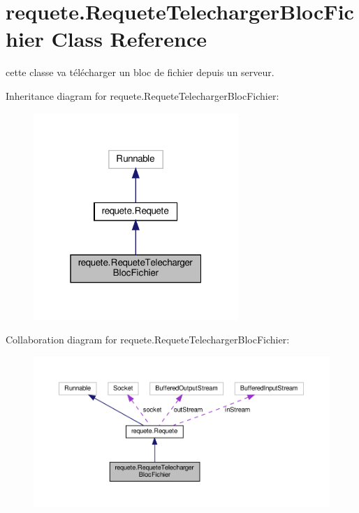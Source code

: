 \hypertarget{classrequete_1_1RequeteTelechargerBlocFichier}{}\section{requete.\+Requete\+Telecharger\+Bloc\+Fichier Class Reference}
\label{classrequete_1_1RequeteTelechargerBlocFichier}


cette classe va télécharger un bloc de fichier depuis un serveur.  




Inheritance diagram for requete.\+Requete\+Telecharger\+Bloc\+Fichier\+:
\nopagebreak
\begin{figure}[H]
\begin{center}
\leavevmode
\includegraphics[width=220pt]{classrequete_1_1RequeteTelechargerBlocFichier__inherit__graph}
\end{center}
\end{figure}


Collaboration diagram for requete.\+Requete\+Telecharger\+Bloc\+Fichier\+:
\nopagebreak
\begin{figure}[H]
\begin{center}
\leavevmode
\includegraphics[width=350pt]{classrequete_1_1RequeteTelechargerBlocFichier__coll__graph}
\end{center}
\end{figure}
